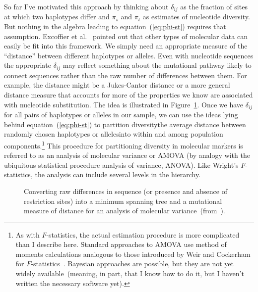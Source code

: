 \documentclass[12pt]{article}
\begin{document}
So far I've motivated this approach by thinking about $\delta_{ij}$ as
the fraction of sites at which two haplotypes differ and $\pi_s$ and
$\pi_t$ as estimates of nucleotide diversity. But nothing in the
algebra leading to equation~(\ref{eq:phi-st}) requires that
assumption. Excoffier et al.~\cite{Excoffier-etal92} pointed out that
other types of molecular data can easily be fit into this
framework. We simply need an appropriate measure of the ``distance''
between different haplotypes or alleles. Even with nucleotide
sequences the appropriate $\delta_{ij}$ may reflect something about
the mutational pathway likely to connect sequences rather than the raw
number of differences between them. For example, the distance might be
a Jukes-Cantor distance or a more general distance measure that
accounts for more of the properties we know are associated with
nucleotide substitution. The idea is illustrated in
Figure~\ref{fig:amova-procedure}. Once we have $\delta_{ij}$ for all
pairs of haplotypes or alleles in our sample, we can use the ideas
lying behind equation~(\ref{eq:phi-st}) to partition
diversity{\dash}the average distance between randomly chosen
haplotypes or alleles{\dash}into within and among population
components.\footnote{As with $F$-statistics, the actual estimation
  procedure is more complicated than I describe here. Standard
  approaches to AMOVA use method of moments calculations analogous to
  those introduced by Weir and Cockerham for
  $F$-statistics~\cite{WeirCockerham84}. Bayesian approaches are
  possible, but they are not yet widely available~(meaning, in part,
  that I know how to do it, but I haven't written the necessary
  software yet).} This procedure for
partitioning diversity in molecular markers is referred to as an
analysis of molecular variance or AMOVA (by analogy with the
ubiquitous statistical procedure analysis of variance, ANOVA). Like
Wright's $F$-statistics, the analysis can include several levels in
the hierarchy.

\begin{figure}
\begin{center}
\end{center}
\caption{Converting raw differences in sequence (or presence and
  absence of restriction sites) into a minimum spanning tree and a
  mutational measure of distance for an analysis of molecular variance~(from~\cite{Excoffier-etal92}).}\label{fig:amova-procedure}
\end{figure}
\end{document}
